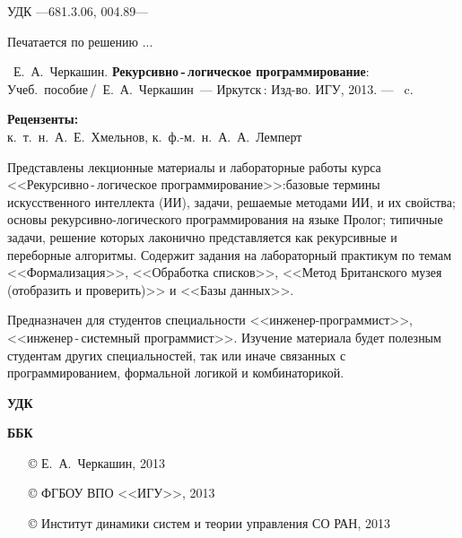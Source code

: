 \documentclass[12pt, openany, twoside]{book} %
\newenvironment{mygroup}{}{}
\begin{document}
\newpage
\begin{mygroup}
\thispagestyle{empty}
\noindent УДК ---681.3.06, 004.89---

\begin{raggedright}
\hspace{6em}Печатается по решению ...
\end{raggedright}

\vfill%
{}

{~Е.~А.~Черкашин.} {\bf Рекурсивно\,-\,логическое программирование}: Учеб.~пособие\,/~Е.~А.~Черкашин~---
Иркутск\,: Изд-во. ИГУ, 2013. --- \pageref{pg:lastpage}~c.
\vspace{1ex}
\begin{center}
\textbf{Рецензенты:} \\
к.~т.~н.~А.~Е.~Хмельнов, к.~ф.-м.~н.~А.~А.~Лемперт
\end{center}
\vspace{1ex}
Представлены лекционные материалы и лабораторные работы курса <<Рекурсивно\,-\,логическое программирование>>:базовые термины искусственного интеллекта (ИИ), задачи, решаемые методами ИИ, и их свойства; основы рекурсивно-логического программирования на языке Пролог; типичные задачи, решение которых лаконично представляется как рекурсивные и переборные алгоритмы. Содержит задания на лабораторный практикум по темам <<Формализация>>, <<Обработка списков>>, <<Метод Британского музея (отобразить и проверить)>> и <<Базы данных>>.

    Предназначен для студентов специальности
<<инженер-програм\-мист>>, <<инженер\,-\,системный програм\-мист>>.
Изучение материала будет полезным студентам других специальностей, так или иначе связанных с программированием, формальной логикой и комбинаторикой.

\textbf{УДК}

\textbf{ББК}

\vfill\vfill

\vfill
\hbox{}\hfill
\begin{minipage}{0.6\linewidth}
\begin{itemize}
\setlength{\itemsep}{0pt}
\setlength{\parsep}{0pt}
\item[\copyright{}] Е.~А.~Черкашин, 2013
\item[\copyright{}] ФГБОУ ВПО <<ИГУ>>, 2013
\item[\copyright{}] Институт динамики систем и теории управления СО РАН, 2013
\end{itemize}
\end{minipage}
\end{mygroup}
\tableofcontents
\clearpage
\end{document}
